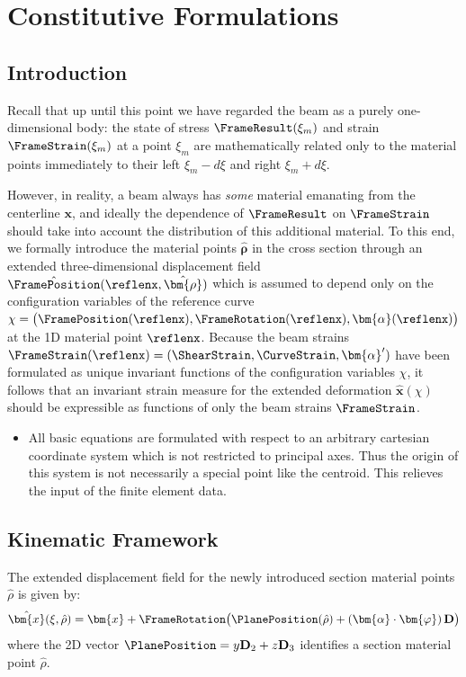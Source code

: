 \chapter{Constitutive Formulations }

\section{Introduction}

Recall that up until this point we have regarded the beam as a purely one-dimensional body: the state of stress $\FrameResult(\xi_m)$ and strain $\FrameStrain(\xi_m)$ at a point $\xi_m$ are mathematically related only to the material points immediately to their left $\xi_m-d\xi$ and right $\xi_m+d\xi$.

However, in reality, a beam always has \emph{some} material emanating from the centerline $\bm{x}$, and ideally the dependence of $\FrameResult$ on $\FrameStrain$ should take into account the distribution of this
additional material. To this end, we formally introduce the material points $\hat{\bm{\rho}}$ in the cross section through an extended three-dimensional displacement field $\hat{\FramePosition}(\reflenx, \hat{\bm{\rho}})$ which is assumed to depend only on the configuration variables of the reference curve \(\chi=\bigl(\FramePosition(\reflenx), \FrameRotation (\reflenx), \bm{\alpha}(\reflenx)\bigr)\) at the 1D material point $\reflenx$. Because the beam strains \(\FrameStrain(\reflenx) = (\ShearStrain , \CurveStrain , \bm{\alpha}^{\prime})\) have been formulated as unique invariant functions of the configuration variables $\chi$, it follows that an invariant strain measure for the extended deformation $\hat{\bm{x}}(\chi)$ should be expressible as functions of only the beam strains $\FrameStrain$.

\begin{itemize}
\item All basic equations are formulated with respect to an arbitrary cartesian coordinate system which is not restricted to principal axes. Thus the origin of this system is not necessarily a special point like the centroid. This relieves the input of the finite element data.
\end{itemize}

\section{Kinematic Framework}

The extended displacement field for the newly introduced section material points $\hat{\rho}$  is given by:
\begin{equation*}
\hat{\bm{x}}(\xi, \hat{\rho}) 
= \bm{x} + \FrameRotation \bigl(\PlanePosition (\hat{\rho}) + (\bm{\alpha}\cdot\bm{\varphi})\, \mathbf{D}\bigr)
\end{equation*}
%
where the 2D vector $\PlanePosition  = y\mathbf{D}_{2} + z\mathbf{D}_3$ identifies a section material point $\hat{\rho}$.

